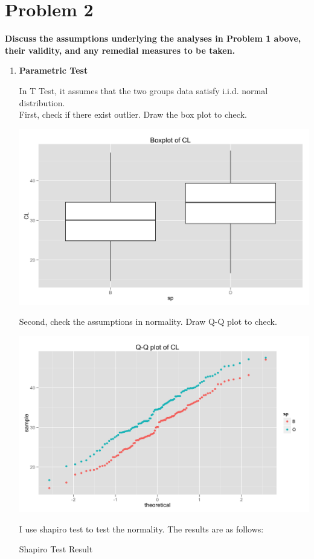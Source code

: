 \documentclass[10pt,letterpaper]{article}
\begin{document}
\section*{Problem 2}
\textbf{Discuss the assumptions underlying the analyses in Problem 1 above, their validity, and any remedial measures to be taken.}
\begin{enumerate}[leftmargin=0cm,itemindent=.5cm,labelwidth=\itemindent,labelsep=0cm,align=left]
\item[\textbullet] \textbf{Parametric Test}

In T Test, it assumes that the two groups data satisfy i.i.d. normal distribution. \\
First, check if there exist outlier. Draw the box plot to check.
\begin{center}
\includegraphics[scale=0.13]{boxgroup}
\end{center}
Second, check the assumptions in normality. Draw Q-Q plot to check. 
\begin{center}
\includegraphics[scale=0.13]{qqplot}
\end{center}
I use shapiro test to test the normality. The results are as follows:
\begin{center}
Shapiro Test Result

\end{center}
 

\end{enumerate}
\end{document}
